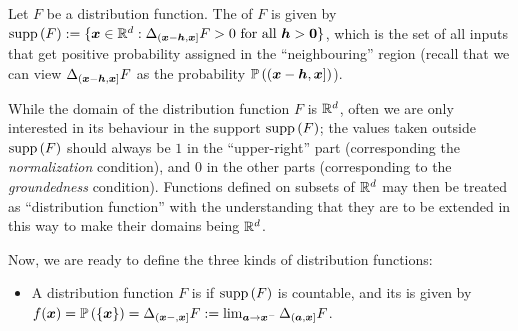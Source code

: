 \begin{enumerate}
Let \(F\) be a distribution function. The  of \(F\) is given by
\(\operatorname{supp}\left(F\right):= \{\bm{x}\in\mathbb{R}^d:\Delta_{(\bm{x}-\bm{h},\bm{x}]}F>0\text{
for all }\bm{h}>\bm{0}\}\), which is the set of all inputs that get
positive probability assigned in the ``neighbouring'' region (recall that we
can view \(\Delta_{(\bm{x}-\bm{h},\bm{x}]}F\) as the probability
\(\mathbb{P}\left((\bm{x}-\bm{h},\bm{x}]\right)\)).

While the domain of the distribution function \(F\) is \(\mathbb{R}^d\), often we are
only interested in its behaviour in the support \(\operatorname{supp}\left(F\right)\); the values taken
outside \(\operatorname{supp}\left(F\right)\) should always be \(1\) in the ``upper-right'' part
(corresponding the \emph{normalization} condition), and \(0\) in the other
parts (corresponding to the \emph{groundedness} condition). Functions defined
on subsets of \(\mathbb{R}^d\) may then be treated as ``distribution function'' with
the understanding that they are to be extended in this way to make their
domains being \(\mathbb{R}^d\).

Now, we are ready to define the three kinds of distribution functions:
\begin{itemize}
\item A distribution function \(F\) is  if \(\operatorname{supp}\left(F\right)\) is
countable, and its  is given by
\(f(\bm{x})=\mathbb{P}\left(\{\bm{x}\}\right)
=\Delta_{(\bm{x}-,\bm{x}]}F
:=\lim_{\bm{a}\to \bm{x}^{-}}\Delta_{(\bm{a},\bm{x}]}F\).


\end{itemize}
\end{enumerate}
